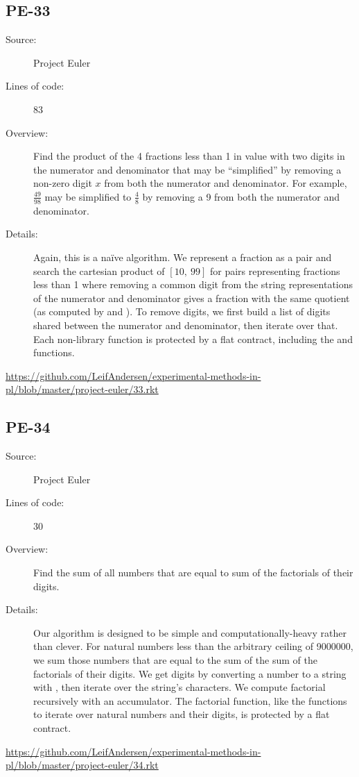 \subsection*{PE-33~\hrulefill}
\begin{description}
\item[Source:] Project Euler
\item[Lines of code:] 83
\item[Overview:]
  Find the product of the 4 fractions less than 1 in value with two digits in the numerator and denominator that may be ``simplified'' by removing a non-zero digit $x$ from both the numerator and denominator.
  For example, $\frac{49}{98}$ may be simplified to $\frac{4}{8}$ by removing a 9 from both the numerator and denominator.
\item[Details:] 
  Again, this is a na\"ive algorithm.
  We represent a fraction as a  pair and search the cartesian product of $[10,~99]$ for pairs representing fractions less than 1 where removing a common digit from the string representations of the numerator and denominator gives a fraction with the same quotient (as computed by \mono{/} and ).
  To remove digits, we first build a list of digits shared between the numerator and denominator, then iterate over that.
  Each non-library function is protected by a flat contract, including the  and  functions.
\end{description}
\url{https://github.com/LeifAndersen/experimental-methods-in-pl/blob/master/project-euler/33.rkt}

\subsection*{PE-34~\hrulefill}
\begin{description}
\item[Source:] Project Euler
\item[Lines of code:] 30
\item[Overview:]
  Find the sum of all numbers that are equal to sum of the factorials of their digits.
\item[Details:] 
  Our algorithm is designed to be simple and computationally-heavy rather than clever.
  For natural numbers less than the arbitrary ceiling of 9000000, we sum those numbers that are equal to the sum of the sum of the factorials of their digits.
  We get digits by converting a number to a string with , then iterate over the string's characters.
  We compute factorial recursively with an accumulator.
  The factorial function, like the functions to iterate over natural numbers and their digits, is protected by a flat contract.
\end{description}
\url{https://github.com/LeifAndersen/experimental-methods-in-pl/blob/master/project-euler/34.rkt}

